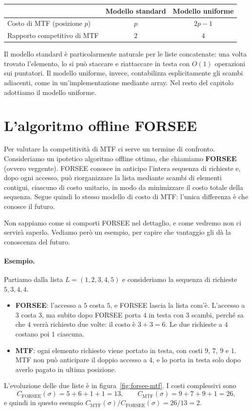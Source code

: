 \begin{center}
\small
\begin{tabular}{lcc}
\toprule
 & Modello standard & Modello uniforme \\
\midrule
Costo di MTF (posizione $p$) & $p$ & $2p - 1$ \\
Rapporto competitivo di MTF & $2$ & $4$ \\
\bottomrule
\end{tabular}
\end{center}

\begin{osservazione}
Il modello standard è particolarmente naturale per le liste concatenate: una volta trovato l'elemento, lo si può staccare e riattaccare in testa con $O(1)$ operazioni sui puntatori. Il modello uniforme, invece, contabilizza esplicitamente gli scambi adiacenti, come in un'implementazione mediante array. Nel resto del capitolo adottiamo il modello uniforme.
\end{osservazione}

\section{L'algoritmo offline FORSEE}\label{sec:forsee}
Per valutare la competitività di MTF ci serve un termine di confronto. Consideriamo un ipotetico algoritmo offline ottimo, che chiamiamo \textbf{FORSEE} (ovvero veggente). FORSEE conosce in anticipo l'intera sequenza di richieste e, dopo ogni accesso, può riorganizzare la lista mediante scambi di elementi contigui, ciascuno di costo unitario, in modo da minimizzare il costo totale della sequenza. Segue quindi lo stesso modello di costo di MTF: l'unica differenza è che conosce il futuro.

Non sappiamo come si comporti FORSEE nel dettaglio, e come vedremo non ci servirà saperlo. Vediamo però un esempio, per capire che vantaggio gli dà la conoscenza del futuro.

\paragraph{Esempio.}
Partiamo dalla lista $L = (1, 2, 3, 4, 5)$ e consideriamo la sequenza di richieste $5, 3, 4, 4$.
\begin{itemize}
    \item \textbf{FORSEE}: l'accesso a $5$ costa $5$, e FORSEE lascia la lista com'è. L'accesso a $3$ costa $3$, ma subito dopo FORSEE porta $4$ in testa con $3$ scambi, perché sa che $4$ verrà richiesto due volte: il costo è $3 + 3 = 6$. Le due richieste a $4$ costano poi $1$ ciascuna.
    \item \textbf{MTF}: ogni elemento richiesto viene portato in testa, con costi $9$, $7$, $9$ e $1$. MTF non può anticipare il doppio accesso a $4$, e lo porta in testa solo dopo averlo pagato in ultima posizione.
\end{itemize}
L'evoluzione delle due liste è in figura~\ref{fig:forsee-mtf}. I costi complessivi sono
\[
C_{\mathrm{FORSEE}}(\sigma) = 5 + 6 + 1 + 1 = 13, \qquad C_{\mathrm{MTF}}(\sigma) = 9 + 7 + 9 + 1 = 26,
\]
e quindi in questo esempio $C_{\mathrm{MTF}}(\sigma) / C_{\mathrm{FORSEE}}(\sigma) = 26/13 = 2$.


